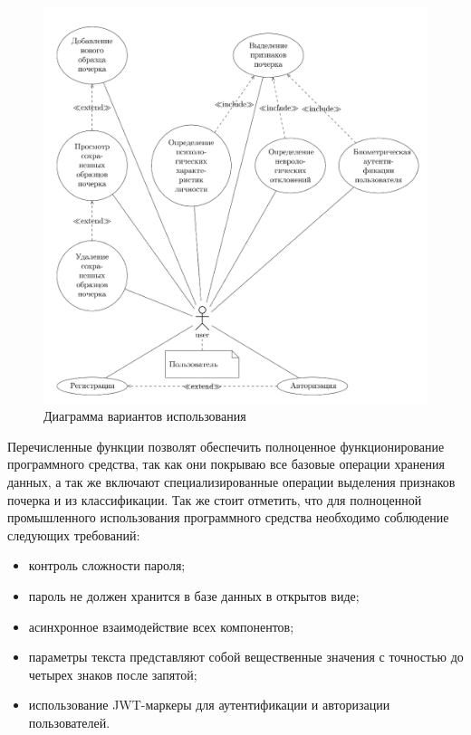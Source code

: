 \begin{figure}[ht]
	\centering
    \includegraphics[scale=1.7]{figures/use_case.png}  
    \caption{Диаграмма вариантов использования}
  	\label{fig:freg:usecase}
\end{figure}

Перечисленные функции позволят обеспечить полноценное функционирование программного средства, так как они покрываю все базовые операции хранения данных, а так же включают специализированные операции выделения признаков почерка и из классификации. Так же стоит отметить, что для полноценной промышленного использования программного средства необходимо соблюдение следующих требований:
\begin{itemize}
  \item контроль сложности пароля;
  \item пароль не должен хранится в базе данных в открытов виде;
  \item асинхронное взаимодействие всех компонентов;
  \item параметры текста представляют собой вещественные значения с точностью до четырех знаков после запятой;
  \item использование JWT-маркеры для аутентификации и авторизации пользователей.
\end{itemize}

